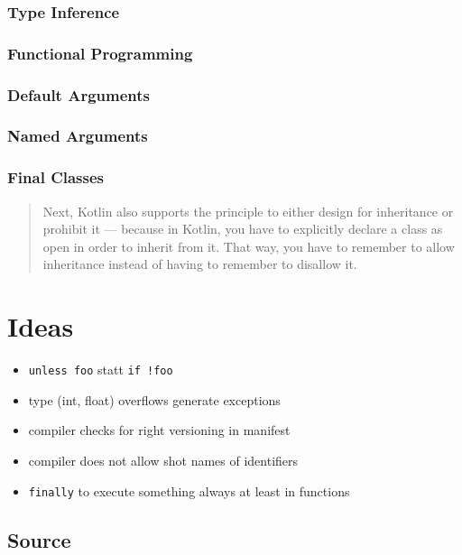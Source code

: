 \documentclass[a4paper,12pt]{article}
\begin{document}
\subsubsection{Type Inference}

\subsubsection{Functional Programming}

\subsubsection{Default Arguments}

\subsubsection{Named Arguments}

\subsubsection{Final Classes}

\begin{quotation}
Next, Kotlin also supports the principle to either design for inheritance or prohibit it — because in Kotlin, you have to explicitly declare a class as open in order to inherit from it. That way, you have to remember to allow inheritance instead of having to remember to disallow it.\cite{kotlin-sommerhoff}
\end{quotation}

\section{Ideas}

\begin{itemize}
	\item \verb|unless foo| statt \verb|if !foo|
	\item type (int, float) overflows generate exceptions
	\item compiler checks for right versioning in manifest
	\item compiler does not allow shot names of identifiers
	\item \verb|finally| to execute something always at least in functions
\end{itemize}

\subsection{Source}
\end{document}
